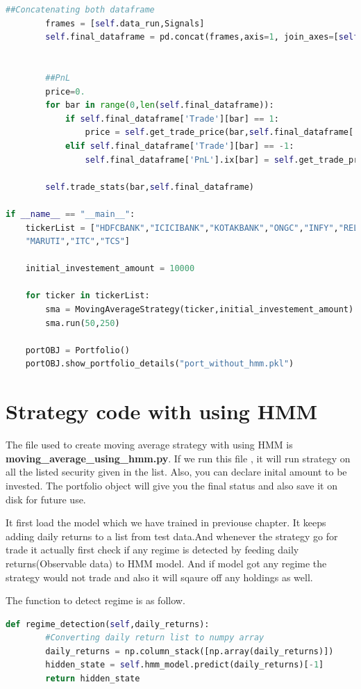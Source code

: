 \documentclass{report}
\begin{document}
\begin{lstlisting}[language=Python]
		##Concatenating both dataframe
		frames = [self.data_run,Signals]
		self.final_dataframe = pd.concat(frames,axis=1, join_axes=[self.data_run.index])
		
		
		##PnL
		price=0.
		for bar in range(0,len(self.final_dataframe)):
			if self.final_dataframe['Trade'][bar] == 1:
				price = self.get_trade_price(bar,self.final_dataframe['Units'][bar])
			elif self.final_dataframe['Trade'][bar] == -1:
				self.final_dataframe['PnL'].ix[bar] = self.get_trade_price(bar,self.final_dataframe['Units'][bar]) - price
			
		self.trade_stats(bar,self.final_dataframe)

if __name__ == "__main__":
	tickerList = ["HDFCBANK","ICICIBANK","KOTAKBANK","ONGC","INFY","RELIANCE","HDFC","LT","IOC","SBIN","HINDUNILVR",
	"MARUTI","ITC","TCS"]

	initial_investement_amount = 10000

	for ticker in tickerList:
		sma = MovingAverageStrategy(ticker,initial_investement_amount)
		sma.run(50,250)

	portOBJ = Portfolio()
	portOBJ.show_portfolio_details("port_without_hmm.pkl")

\end{lstlisting} 


\chapter{Strategy code with using HMM}
The file used to create moving average strategy with using HMM is \textbf{moving\_average\_using\_hmm.py}.
If we run this file , it will run strategy on all the listed security given in the list.
Also, you can declare inital amount to be invested. The portfolio object will give you the final status and also save it on disk for future use.

It first load the model which we have trained in previouse chapter. It keeps adding daily returns to a list from test data.And whenever the strategy go for trade it actually first check if any regime is detected by feeding daily returns(Observable data) to HMM model. And if model got any regime the strategy would not trade and also it will sqaure off any holdings as well.

\newpage

The function to detect regime is as follow.

\begin{lstlisting}[language=Python]
def regime_detection(self,daily_returns):
		#Converting daily return list to numpy array
		daily_returns = np.column_stack([np.array(daily_returns)])
		hidden_state = self.hmm_model.predict(daily_returns)[-1]
		return hidden_state

\end{lstlisting}
\end{document}
